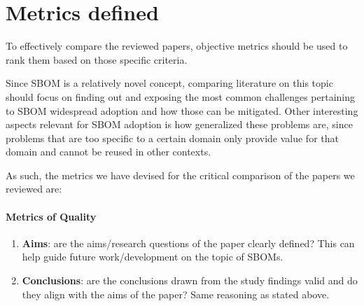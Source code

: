 \section{Metrics defined} \label{metrics}

To effectively compare the reviewed papers, objective metrics should be used to rank them based on those specific criteria.

\noindent Since SBOM is a relatively novel concept, comparing literature on this topic should focus on finding out and exposing the most common challenges pertaining to SBOM widespread adoption and how those can be mitigated. Other interesting aspects relevant for SBOM adoption is how generalized these problems are, since problems that are too specific to a certain domain only provide value for that domain and cannot be reused in other contexts.

\noindent As such, the metrics we have devised for the critical comparison of the papers we reviewed are:

\paragraph{Metrics of Quality}
\begin{enumerate}
    \item \textbf{Aims}: are the aims/research questions of the paper clearly defined? This can help guide future work/development on the topic of SBOMs.
    \item \textbf{Conclusions}: are the conclusions drawn from the study findings valid and do they align with the aims of the paper? Same reasoning as stated above.
          \setcounter{metrics}{\value{enumi}}
\end{enumerate}

